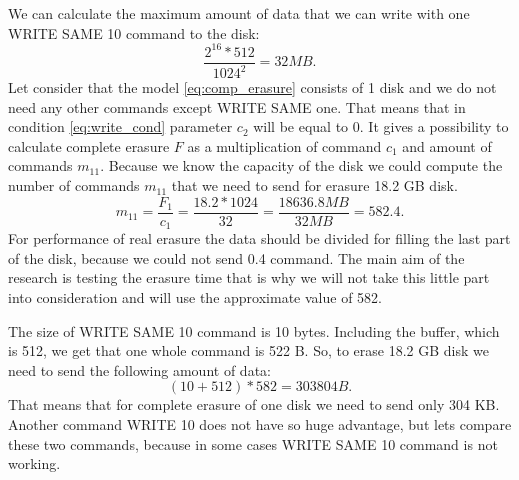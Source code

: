 We can calculate the maximum amount of data that we can write with one WRITE SAME 10 command to the disk:
\begin{equation}
	\frac{2^{16}*512}{1024^2} = 32 MB.
\end{equation}
Let consider that the model \ref{eq:comp_erasure} consists of 1 disk and we do not need any other commands except WRITE SAME one. That means that in condition \ref{eq:write_cond} parameter $c_2$ will be equal to 0. It gives a possibility to calculate complete erasure $F$ as a multiplication of command $c_1$ and amount of commands $m_{11}$. Because we know the capacity of the disk we could compute the number of commands $m_{11}$ that we need to send for erasure 18.2 GB disk.
\begin{equation}
	m_{11} =\frac{F_1}{c_1} = \frac{18.2*1024}{32} = \frac{18636.8MB}{32MB} = 582.4.
\end{equation}
For performance of real erasure the data should be divided for filling the last part of the disk, because we could not send 0.4 command. The main aim of the research is testing the erasure time that is why we will not take this little part into consideration and will use the approximate value of 582.

The size of WRITE SAME 10 command is 10 bytes. Including the buffer, which is 512, we get that one whole command is 522 B.
So, to erase 18.2 GB disk we need to send the following amount of data:
\begin{equation}
	(10 + 512)*582 = 303804 B.
\end{equation}
That means that for complete erasure of one disk we need to send only 304 KB. Another command WRITE 10 does not have so huge advantage, but lets compare these two commands, because in some cases WRITE SAME 10 command is not working.


